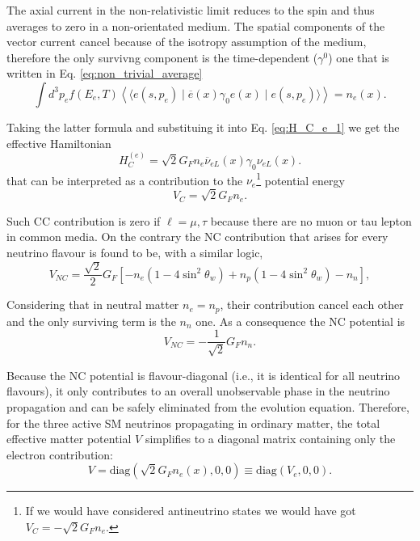 The axial current in the non-relativistic limit reduces to the spin and thus averages to zero in a non-orientated medium. The spatial components of the vector current cancel because of the isotropy assumption of the medium, therefore the only survivng component is the time-dependent ($\gamma^{0}$) one that is written in Eq. \ref{eq:non_trivial_average}
\begin{equation}
    \label{eq:non_trivial_average}
    \int d^3p_e f(E_e, T) \left\langle \langle e(s, p_e) \mid \overline{e}(x)\gamma_0 e(x) \mid e(s, p_e)\rangle \right\rangle = n_e(x).
\end{equation}

Taking the latter formula and substituing it into Eq. \ref{eq:H_C_e_1} we get the effective Hamiltonian
\begin{equation}
    \label{eq:H_C_e_final}
    H_C^{(e)} = \sqrt{2} G_F n_e \overline{\nu}_{eL}(x) \gamma_0 \nu_{eL}(x).
\end{equation}
that can be interpreted as a contribution to the $\nu_e$\footnote{If we would have considered antineutrino states we would have got $V_C = -\sqrt{2} G_F n_e$.} potential energy
\begin{equation}
    \label{eq:V_C_potential}
    V_C = \sqrt{2} G_F n_e.
\end{equation}

Such \ac{CC} contribution is zero if $\ell = \mu, \tau$ because there are no muon or tau lepton in common media.
On the contrary the \ac{NC} contribution that arises for every neutrino flavour is found to be, with a similar logic,
\begin{equation}
    \label{eq:V_NC_full}
    V_{NC} = \frac{\sqrt{2}}{2} G_F \left[ -n_e (1 - 4 \sin^2 \theta_w) + n_p (1 - 4 \sin^2 \theta_w) - n_n \right],
\end{equation}

Considering that in neutral matter $n_e = n_p$, their contribution cancel each other and the only surviving term is the $n_n$ one.
As a consequence the \ac{NC} potential is
\begin{equation}
    \label{eq:V_NC_neutron}
    V_{NC} = -\frac{1}{\sqrt{2}} G_F n_n.
\end{equation}

Because the \ac{NC} potential is flavour-diagonal (i.e., it is identical for all neutrino flavours), it only contributes to an overall unobservable phase in the neutrino propagation and can be safely eliminated from the evolution equation. Therefore, for the three active \ac{SM} neutrinos propagating in ordinary matter, the total effective matter potential $V$ simplifies to a diagonal matrix containing only the electron contribution:
\begin{equation}
    \label{eq:matter_potential_matrix}
    V = \text{diag}(\sqrt{2}G_F n_e(x), 0, 0) \equiv \text{diag}(V_e, 0, 0).
\end{equation}

